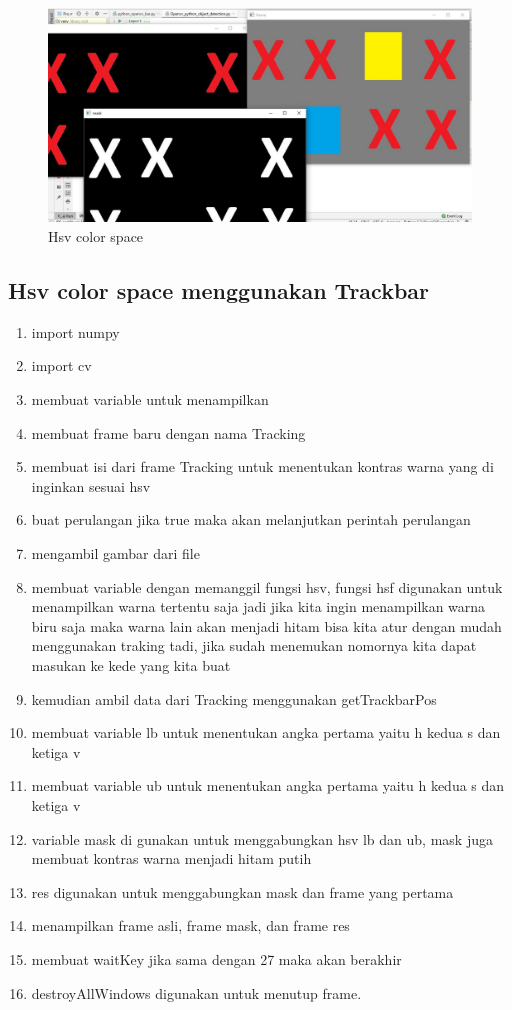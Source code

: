 \begin{figure}[ht]
\centering
\includegraphics[scale=0.35]{figures/2,35.jpg}
\caption{Hsv color space}
\label{contoh}
\end{figure}



\newpage
\subsection{Hsv color space menggunakan Trackbar}

\begin{enumerate}
	\item import numpy
	\item import cv
	\item membuat variable untuk menampilkan
	\item membuat frame baru dengan nama Tracking
	\item membuat isi dari frame Tracking untuk menentukan kontras warna yang di inginkan sesuai hsv
	\item buat perulangan jika true maka akan melanjutkan perintah perulangan
	\item mengambil gambar dari file
	\item membuat variable dengan memanggil fungsi hsv, fungsi hsf digunakan untuk menampilkan warna tertentu saja jadi jika kita ingin menampilkan warna biru saja maka warna lain akan menjadi hitam bisa kita atur dengan mudah menggunakan traking tadi, jika sudah menemukan nomornya kita dapat masukan ke kede yang kita buat
	\item kemudian ambil data dari Tracking menggunakan getTrackbarPos
	\item membuat variable lb untuk menentukan angka pertama yaitu h kedua s dan ketiga v
	\item membuat variable ub untuk menentukan angka pertama yaitu h kedua s dan ketiga v
	\item variable mask di gunakan untuk menggabungkan hsv lb dan ub, mask juga membuat kontras warna menjadi hitam putih
	\item res digunakan untuk menggabungkan mask dan frame yang pertama
	\item menampilkan frame asli, frame mask, dan frame res
	\item membuat waitKey jika sama dengan 27 maka akan berakhir
	\item destroyAllWindows digunakan untuk menutup frame.
\end{enumerate}

